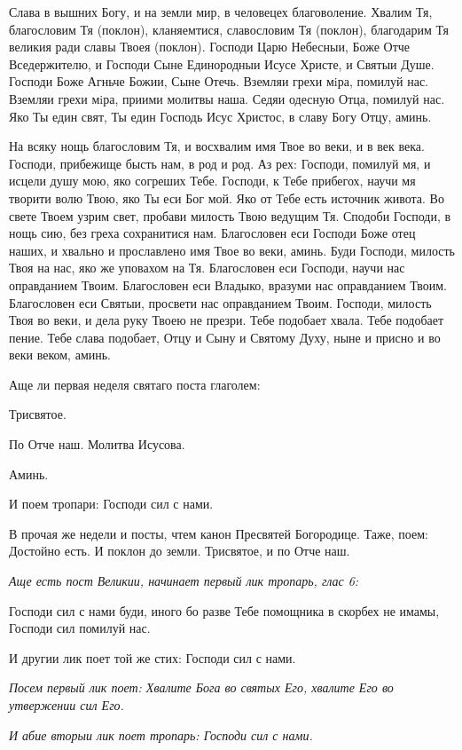 Слава в вышних Богу, и на земли мир, в человецех благоволение. Хвалим Тя, благословим Тя (поклон), кланяемтися, славословим Тя (поклон), благодарим Тя великия ради славы Твоея (поклон). Господи Царю Небесныи, Боже Отче Вседержителю, и Господи Сыне Единородныи Исусе Христе, и Святыи Душе. Господи Боже Агньче Божии, Сыне Отечь. Вземляи грехи мiра, помилуй нас. Вземляи грехи мiра, приими молитвы наша. Седяи одесную Отца, помилуй нас. Яко Ты един свят, Ты един Господь Исус Христос, в славу Богу Отцу, аминь.

На всяку нощь благословим Тя, и восхвалим имя Твое во веки, и в век века. Господи, прибежище бысть нам, в род и род. Аз рех: Господи, помилуй мя, и исцели душу мою, яко согреших Тебе. Господи, к Тебе прибегох, научи мя творити волю Твою, яко Ты еси Бог мой. Яко от Тебе есть источник живота. Во свете Твоем узрим свет, пробави милость Твою ведущим Тя. Сподоби Господи, в нощь сию, без греха сохранитися нам. Благословен еси Господи Боже отец наших, и хвально и прославлено имя  Твое во веки, аминь. Буди  Господи, милость Твоя на нас, яко же уповахом на Тя. Благословен еси Господи, научи нас оправданием Твоим. Благословен еси Владыко, вразуми нас оправданием Твоим. Благословен еси Святыи, просвети нас оправданием Твоим. Господи, милость Твоя во веки, и дела руку Твоею не презри. Тебе подобает хвала. Тебе подобает пение. Тебе слава подобает, Отцу и Сыну и Святому Духу, ныне и присно и во веки веком, аминь.

Аще ли первая неделя святаго поста глаголем:

Трисвятое. 

По Отче наш. Молитва Исусова.

Аминь.

И поем тропари: Господи сил с нами.

В прочая же недели и посты, чтем канон Пресвятей Богородице. Таже, поем: Достойно есть. И поклон до земли. Трисвятое, и по Отче наш.


\itshape Аще есть пост Великии, начинает первый лик тропарь, глас 6:\normalfont{}

Господи сил с нами буди, иного бо разве Тебе помощника в скорбех не имамы, Господи сил помилуй нас.

И другии лик поет той же стих: Господи сил с нами.


\itshape Посем первый лик поет:\normalfont{} Хвалите Бога во святых Его, хвалите Его во утвержении сил Его.


\itshape И абие вторыи лик поет тропарь:\normalfont{} Господи сил с нами.


